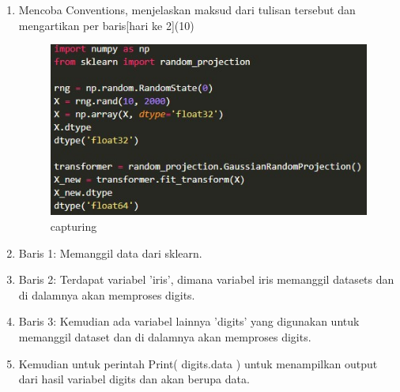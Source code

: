 \begin{enumerate}
\item 
Mencoba Conventions, menjelaskan maksud dari tulisan tersebut dan mengartikan per baris[hari ke 2](10)

\begin{figure}
\centering
\includegraphics[scale=0.5]{figures/cahya5.png}
\caption{capturing}	
\end{figure}

\item Baris 1:
Memanggil data dari sklearn.
\item Baris 2:
Terdapat variabel 'iris', dimana variabel iris memanggil datasets dan di dalamnya akan memproses digits.
\item Baris 3:
Kemudian ada variabel lainnya 'digits' yang digunakan untuk memanggil dataset dan di dalamnya akan memproses digits.
\item Kemudian untuk perintah Print( digits.data ) untuk menampilkan output dari hasil variabel digits dan akan berupa data.

\end{enumerate}

